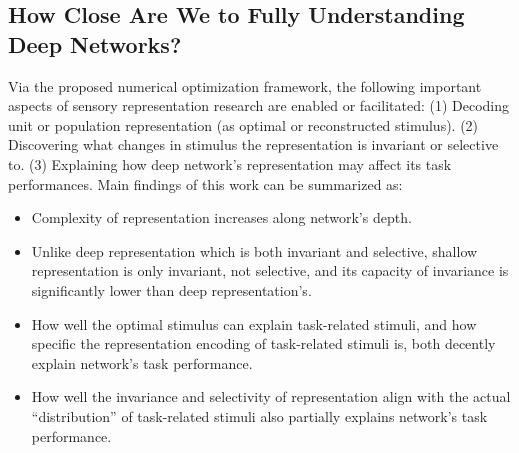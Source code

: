 \subsection*{How Close Are We to Fully Understanding Deep Networks?} %

Via the proposed numerical optimization framework, the following important aspects of sensory representation research are enabled or facilitated: (1) Decoding unit or population representation (as optimal or reconstructed stimulus). (2) Discovering what changes in stimulus the representation is invariant or selective to. (3) Explaining how deep network's representation may affect its task performances. Main findings of this work can be summarized as:
\begin{itemize} %
\item Complexity of representation increases along network's depth.
\item Unlike deep representation which is both invariant and selective, shallow representation is only invariant, not selective, and its capacity of invariance is significantly lower than deep representation's.
\item How well the optimal stimulus can explain task-related stimuli, and how specific the representation encoding of task-related stimuli is, both decently explain network's task performance.
\item How well the invariance and selectivity of representation align with the actual ``distribution'' of task-related stimuli also partially explains network's task performance.
\end{itemize}
